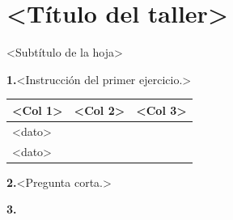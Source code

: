 

\renewcommand{\hdrcapitulo}{<Asignatura> · <Grado> · <Tema>}



\section{<Título del taller>}

\begin{hoja}{<Subtítulo de la hoja>}

\textbf{1.}\enspace <Instrucción del primer ejercicio.>

\par\smallskip
{\centering\renewcommand{\arraystretch}{2.4}\sffamily\small
\begin{tabular}{|>{\centering\arraybackslash}p{3cm}|>{\centering\arraybackslash}p{3cm}|>{\centering\arraybackslash}p{3.6cm}|}
\hline
\textbf{<Col 1>} & \textbf{<Col 2>} & \textbf{<Col 3>} \\\hline
<dato> & & \\\hline
<dato> & & \\\hline
\end{tabular}\par}

\vspace{0.6em}
\textbf{2.}\enspace <Pregunta corta.>\quad \linea[3.5cm]

\vspace{0.4em}
\textbf{3.}
\lineaescritura\lineaescritura

\end{hoja}


